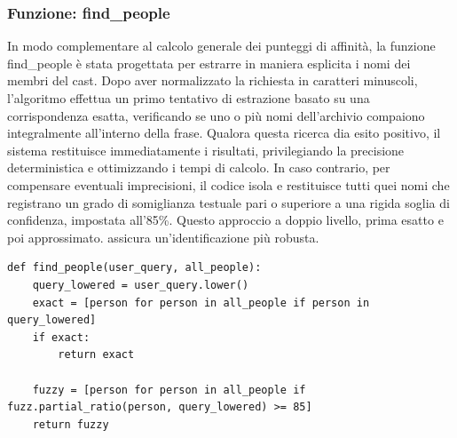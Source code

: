 \documentclass{article}
\begin{document}
\subsubsection{Funzione: find\_people}
In modo complementare al calcolo generale dei punteggi di affinit\`a, la funzione find\_people \`e stata progettata per estrarre in maniera esplicita i nomi dei membri del cast. Dopo aver normalizzato la richiesta in caratteri minuscoli, l'algoritmo effettua un primo tentativo di estrazione basato su una corrispondenza esatta, verificando se uno o pi\`u nomi dell'archivio compaiono integralmente all'interno della frase. Qualora questa ricerca dia esito positivo, il sistema restituisce immediatamente i risultati, privilegiando la precisione deterministica e ottimizzando i tempi di calcolo. In caso contrario, per compensare eventuali imprecisioni, il codice isola e restituisce tutti quei nomi che registrano un grado di somiglianza testuale pari o superiore a una rigida soglia di confidenza, impostata all'85\%. Questo approccio a doppio livello, prima esatto e poi approssimato. assicura un'identificazione pi\`u robusta.
\begin{lstlisting}
def find_people(user_query, all_people):
	query_lowered = user_query.lower()
	exact = [person for person in all_people if person in query_lowered]
	if exact:
		return exact
	
	fuzzy = [person for person in all_people if fuzz.partial_ratio(person, query_lowered) >= 85]
	return fuzzy
\end{lstlisting}
\end{document}

